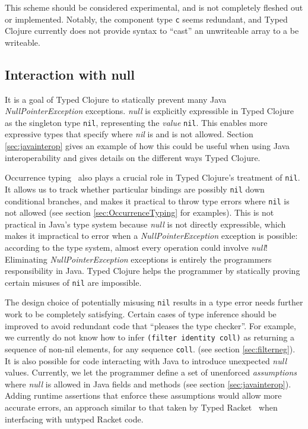 This scheme should be considered experimental, and is not completely fleshed out or implemented.
Notably, the component type \lstinline|c| seems redundant, and Typed Clojure currently
does not provide syntax to ``cast'' an unwriteable array to a be writeable.

\subsection{Interaction with null}
\label{sec:interactionnull}

It is a goal of Typed Clojure to statically prevent many Java \emph{NullPointerException}
exceptions.
\emph{null} is explicitly expressible in Typed Clojure as the singleton type \lstinline|nil|,
representing the \emph{value} \lstinline|nil|.
This enables more expressive types that specify where \emph{nil} is and is not allowed.
Section \ref{sec:javainterop} gives an example of how this could be useful 
when using Java interoperability and gives details on the different ways Typed Clojure.

Occurrence typing~\cite{TF10} also plays a crucial role in Typed Clojure's
treatment of \lstinline|nil|.
It allows us to track whether particular bindings are possibly \lstinline|nil|
down conditional branches, and makes it practical to throw type errors 
where \lstinline|nil| is not allowed (see section \ref{sec:OccurrenceTyping} for examples).
This is not practical in Java's type system because \emph{null} is not directly
expressible, which makes it impractical to error when a \emph{NullPointerException}
exception is possible: according to the type system, almost every operation
could involve \emph{null}!
Eliminating \emph{NullPointerException} exceptions is entirely the programmers
responsibility in Java.
Typed Clojure helps the programmer by statically proving certain misuses of \lstinline|nil| are impossible.

The design choice of potentially misusing \lstinline|nil| results in a type error
needs further work to be completely satisfying.
Certain cases of type inference should be improved to avoid redundant code
that ``pleases the type checker''.
For example, we currently do not know how to infer \lstinline|(filter identity coll)|
as returning a sequence of non-nil elements, for any sequence \lstinline|coll|.
(see section \ref{sec:filterneg}).
It is also possible for code interacting with Java to introduce unexpected \emph{null}
values. Currently, we let the programmer define a set of unenforced \emph{assumptions}
where \emph{null} is allowed in Java fields and methods (see section \ref{sec:javainterop}).
Adding runtime assertions that enforce these assumptions would allow more
accurate errors, an approach similar to that taken by Typed Racket~\cite{Tob10} when
interfacing with untyped Racket code.


